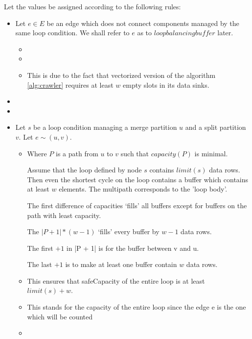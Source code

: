   Let the values be assigned according to the following rules:
  \begin{itemize}
    \item Let $e \in E$ be an edge which does not connect components managed by the same loop condition. We shall refer to $e$ as to $loop balancing buffer$ later.
    \begin{itemize}
      \item {}
      \item {}
      \item {}
        
        This is due to the fact that vectorized version of the algorithm \ref{alg:crawler} requires at least $w$ empty slots in its data sinks.

    \end{itemize}
    \item {}
    \item {} 
    \item Let $s$ be a loop condition managing a merge partition $u$ and a split partition $v$. Let $e \sim (u,v)$.
    \begin{itemize}
      \item {} 

      Where $P$ is a path from $u$ to $v$ such that $capacity(P)$ is minimal.

        Assume that the loop defined by node $s$ contains $limit(s)$ data rows. Then even the shortest cycle on the loop contains a buffer which contains at least $w$ elements. The multipath corresponds to the 'loop body'. 
        
        The first difference of capacities `fills' all buffers except for buffers on the path with least capacity. 
        
        The $| P +1 | * (w-1)$ `fills' every buffer by $w-1$ data rows. 
        
        The first $+1$ in |P + 1| is for the buffer between v and u. 
        
        The last $+1$ is to make at least one buffer contain $w$ data rows.

      \item {}
        
        This ensures that safeCapacity of the entire loop is at least $limit(s) + w$. 
      \item {}
        
        This stands for the capacity of the entire loop since the edge e is the one which will be counted
      \item {}
    \end{itemize}
  \end{itemize}
